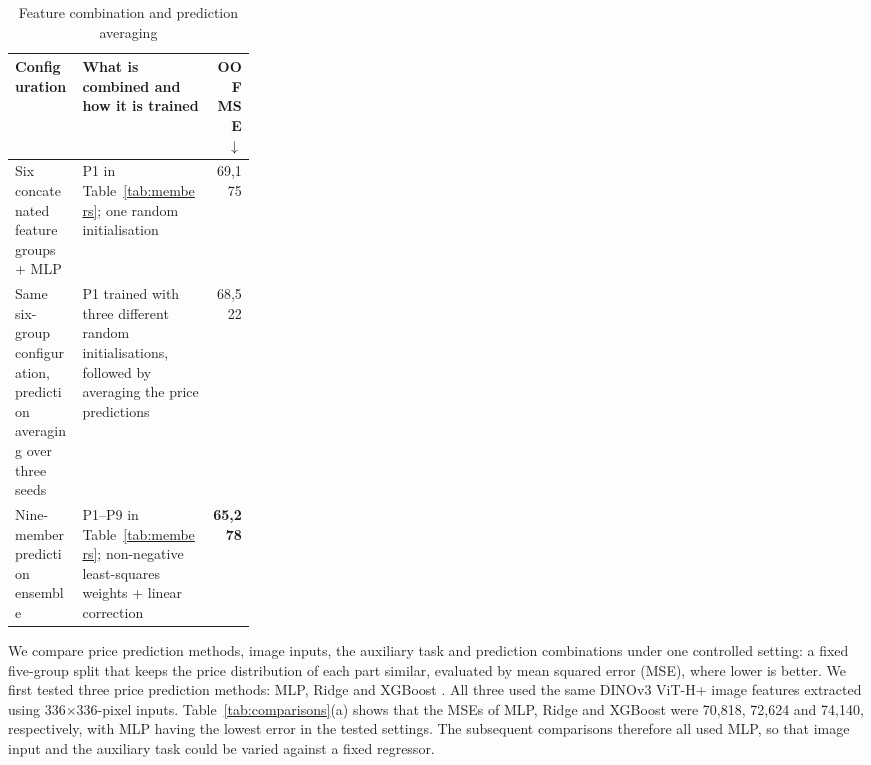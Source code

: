 \begin{table}[!t]
\centering\footnotesize
\caption{Feature combination and prediction averaging}
\label{tab:ensemble}
\begin{tabularx}{\linewidth}{@{}>{\raggedright\arraybackslash}p{0.28\linewidth}>{\raggedright\arraybackslash}X r@{}}
\toprule
Configuration & What is combined and how it is trained & OOF MSE \ensuremath{\downarrow} \\
\midrule
Six concatenated feature groups + MLP & P1 in Table~\ref{tab:members}; one random initialisation & 69,175 \\
Same six-group configuration, prediction averaging over three seeds & P1 trained with three different random initialisations, followed by averaging the price predictions & 68,522 \\
Nine-member prediction ensemble & P1--P9 in Table~\ref{tab:members}; non-negative least-squares weights + linear correction & \textbf{65,278} \\
\bottomrule
\end{tabularx}

\par{}
\end{table}


We compare price prediction methods, image inputs, the auxiliary task and prediction combinations under one controlled setting: a fixed five-group split that keeps the price distribution of each part similar, evaluated by mean squared error (MSE), where lower is better. We first tested three price prediction methods: MLP, Ridge and XGBoost \cite{chen2016xgboost}. All three used the same DINOv3 ViT-H+ image features extracted using 336\ensuremath{\times}336-pixel inputs. Table~\ref{tab:comparisons}(a) shows that the MSEs of MLP, Ridge and XGBoost were 70,818, 72,624 and 74,140, respectively, with MLP having the lowest error in the tested settings. The subsequent comparisons therefore all used MLP, so that image input and the auxiliary task could be varied against a fixed regressor.


